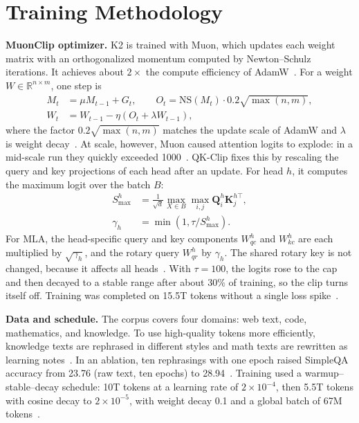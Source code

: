 \documentclass[conference]{IEEEtran}
\begin{document}
\section{Training Methodology}
\textbf{MuonClip optimizer.} K2 is trained with Muon, which updates each weight matrix with an orthogonalized momentum computed by Newton--Schulz iterations. It achieves about $2\times$ the compute efficiency of AdamW~\cite{muon}. For a weight $W\in\mathbb{R}^{n\times m}$, one step is
\begin{align}
M_t&=\mu M_{t-1}+G_t,\qquad O_t=\mathrm{NS}(M_t)\cdot0.2\sqrt{\max(n,m)},\\
W_t&=W_{t-1}-\eta\left(O_t+\lambda W_{t-1}\right),
\end{align}
where the factor $0.2\sqrt{\max(n,m)}$ matches the update scale of AdamW and $\lambda$ is weight decay~\cite{kimik2,muon}. At scale, however, Muon caused attention logits to explode: in a mid-scale run they quickly exceeded 1000~\cite{kimik2}. QK-Clip fixes this by rescaling the query and key projections of each head after an update. For head $h$, it computes the maximum logit over the batch $B$:
\begin{align}
S^{h}_{\max}&=\frac{1}{\sqrt{d}}\max_{X\in B}\max_{i,j}\mathbf{Q}^{h}_i\mathbf{K}^{h\top}_j,\\
\gamma_h&=\min\!\left(1,\tau/S^{h}_{\max}\right).
\end{align}
For MLA, the head-specific query and key components $W^h_{qc}$ and $W^h_{kc}$ are each multiplied by $\sqrt{\gamma_h}$, and the rotary query $W^h_{qr}$ by $\gamma_h$. The shared rotary key is not changed, because it affects all heads~\cite{kimik2}. With $\tau=100$, the logits rose to the cap and then decayed to a stable range after about 30\% of training, so the clip turns itself off. Training was completed on 15.5T tokens without a single loss spike~\cite{kimik2}.

\textbf{Data and schedule.} The corpus covers four domains: web text, code, mathematics, and knowledge. To use high-quality tokens more efficiently, knowledge texts are rephrased in different styles and math texts are rewritten as learning notes~\cite{kimik2}. In an ablation, ten rephrasings with one epoch raised SimpleQA accuracy from 23.76 (raw text, ten epochs) to 28.94~\cite{kimik2}. Training used a warmup--stable--decay schedule: 10T tokens at a learning rate of $2\times10^{-4}$, then 5.5T tokens with cosine decay to $2\times10^{-5}$, with weight decay 0.1 and a global batch of 67M tokens~\cite{kimik2}.
\end{document}
